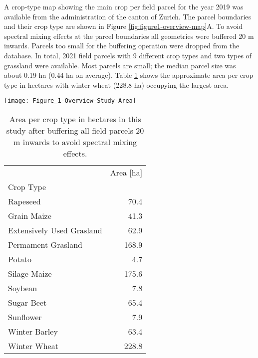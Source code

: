 A crop-type map showing the main crop per field parcel for the year 2019 was available from the administration of the canton of Zurich. The parcel boundaries and their crop type are shown in Figure \ref{fig:figure1-overview-map}A. To avoid spectral mixing effects at the parcel boundaries all geometries were buffered 20 m inwards. Parcels too small for the buffering operation were dropped from the database. In total, 2021 field parcels with 9 different crop types and two types of grassland were available. Most parcels are small; the median parcel size was about 0.19 ha (0.44 ha on average). Table \ref{tab:crop-area} shows the approximate area per crop type in hectares with winter wheat (228.8 ha) occupying the largest area.

\begin{figure*}
    \centering
    \texttt{[image: Figure\_1-Overview-Study-Area]}
    \caption{Map of the study area with the field parcel geometries buffered 20 m inwards and their main crop types in 2019 (A) and the location of the Sentinel-2 tile T32TMT and the study region in Western Europe (B).}
    \label{fig:figure1-overview-map}
\end{figure*}

\begin{table}[!t]
    \centering
     \caption{Area per crop type in hectares in this study after buffering all field parcels 20 m inwards to avoid spectral mixing effects.}
    \begin{tabular}{lr}
    \toprule
    {} &   Area [ha] \\
    Crop Type                 &        \\
    \midrule
    Rapeseed                    &   70.4 \\
    Grain Maize                      &   41.3 \\
    Extensively Used Grasland &   62.9 \\
    Permament Grasland        &  168.9 \\
    Potato                    &    4.7 \\
    Silage Maize              &  175.6 \\
    Soybean                   &    7.8 \\
    Sugar Beet                &   65.4 \\
    Sunflower                 &    7.9 \\
    Winter Barley             &   63.4 \\
    Winter Wheat              &  228.8 \\
    \bottomrule
    \end{tabular}
    \label{tab:crop-area}
\end{table}

